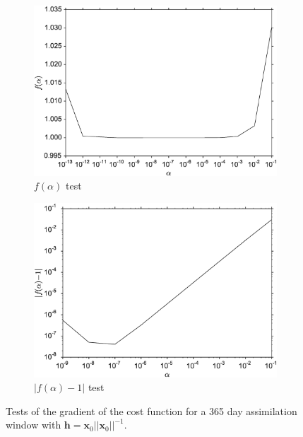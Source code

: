 \documentclass[11pt]{article}
\begin{document}
\begin{figure}[ht]
    \centering
    \begin{subfigure}[b]{0.49\textwidth}
        \includegraphics[width=\textwidth]{costone_cvt.eps}
        \caption{$f(\alpha)$ test}
        \label{fig:costone}
    \end{subfigure}
    \begin{subfigure}[b]{0.49\textwidth}
        \includegraphics[width=\textwidth]{cost_cvt.eps}
        \caption{$|f(\alpha) - 1|$ test}
        \label{fig:cost}
    \end{subfigure}
    \caption{Tests of the gradient of the cost function for a 365 day assimilation window with $\textbf{h}=\textbf{x}_0||\textbf{x}_0||^{-1}$.}
    \label{fig:testgradcostone}
\end{figure}
\end{document}
